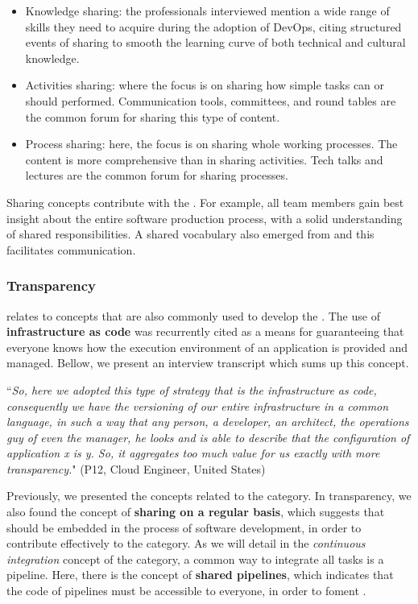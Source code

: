 \begin{itemize}
\item Knowledge sharing: the professionals interviewed mention a wide range of
skills they need to acquire during the adoption of DevOps, citing
structured events of sharing to smooth the learning curve of both technical and
cultural knowledge.


\item Activities sharing: where the focus is on sharing how simple tasks can or
should performed. Communication tools, committees, and round tables are the common
forum for sharing this type of content.

\item Process sharing: here, the focus is on sharing whole working processes. The
content is more comprehensive than in sharing activities. Tech talks and
lectures are the common forum for sharing processes.

\end{itemize}

Sharing concepts contribute with the . For example,
all team members gain best insight about the entire software production
process, with a solid understanding of shared responsibilities. A shared vocabulary also
emerged from  and this facilitates communication.

\subsubsection*{{\bf Transparency}} relates to concepts that are also commonly used to develop the
. The use of \textbf{infrastructure as code} was
recurrently cited as a means for guaranteeing that everyone knows how the execution environment of
an application is provided and managed. Bellow, we present an interview
transcript which sums up this concept.

\begin{mq}
``\emph{So, here we adopted this type of strategy that is the infrastructure as code,
consequently we have the versioning of our entire infrastructure in a common
language, in such a way that any person, a developer, an architect, the
operations guy of even the manager, he looks and is able to describe that the
configuration of application x is y. So, it aggregates too much value for us
exactly with more transparency.}" (P12, Cloud Engineer, United States)
\end{mq}

Previously, we presented the concepts related to the  category. In
transparency, we also found the concept of \textbf{sharing on a regular basis}, which suggests
that  should be embedded in the process of software
development, in order to contribute effectively to the  category.
As we will detail in the \emph{continuous integration} concept of
the  category, a common way to integrate all tasks is a pipeline. Here, there is the
concept of \textbf{shared pipelines}, which indicates that the code of pipelines
must be accessible to everyone, in order to foment .

